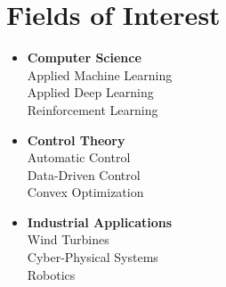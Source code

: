 \documentclass[letterpaper,10.8pt]{article}
\begin{document}
\section{Fields of Interest}
\begin{multicols}{3}
\begin{itemize}
    \item \textbf{Computer Science}\\
    Applied Machine Learning\\
    Applied Deep Learning\\
    Reinforcement Learning\\
    
    
    \item \textbf{Control Theory}\\
    Automatic Control\\
    Data-Driven Control\\
    Convex Optimization
    
    \item \textbf{Industrial Applications}\\
    Wind Turbines\\
    Cyber-Physical Systems\\
    Robotics
\end{itemize}

\end{multicols}



\end{document}
